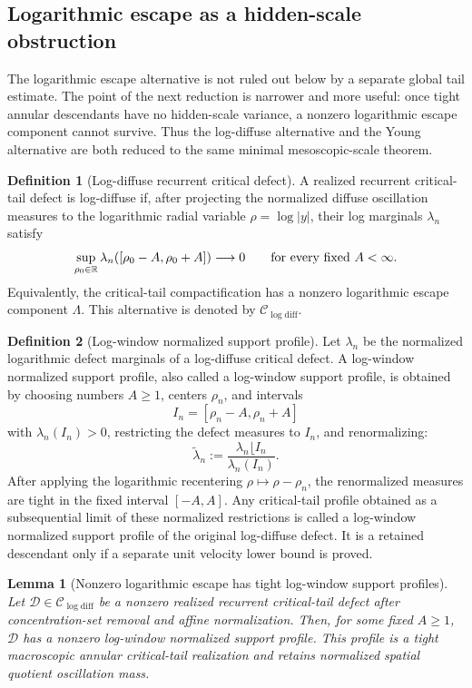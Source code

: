 \documentclass[11pt]{amsart}
\numberwithin{equation}{section}
\theoremstyle{plain}
\newtheorem{lemma}[lemma]{Lemma}
\theoremstyle{definition}
\newtheorem{definition}[definition]{Definition}
\theoremstyle{remark}
\newcommand{\Clogdiff}{\mathcal C_{\log\mathrm{diff}}}
\begin{document}
\subsection{Logarithmic escape as a hidden-scale obstruction}
\label{subsec:logarithmic-escape-hidden-scale}

The logarithmic escape alternative is not ruled out below by a separate global
tail estimate.  The point of the next reduction is narrower and more useful:
once tight annular descendants have no hidden-scale variance, a nonzero
logarithmic escape component cannot survive.  Thus the log-diffuse alternative and
the Young alternative are both reduced to the same minimal mesoscopic-scale
theorem.

\begin{definition}[Log-diffuse recurrent critical defect]
\label{def:log-diffuse-recurrent-critical-defect}
A realized recurrent critical-tail defect is log-diffuse if, after projecting
the normalized diffuse oscillation measures to the logarithmic radial variable
\(\rho=\log |y|\), their log marginals \(\lambda_n\) satisfy
\[
   \sup_{\rho_0\in\mathbb R}
   \lambda_n([\rho_0-A,\rho_0+A])\longrightarrow0
   \qquad\hbox{for every fixed }A<\infty .
\]
Equivalently, the critical-tail compactification has a nonzero logarithmic
escape component \(\Lambda\).  This alternative is denoted by \(\Clogdiff\).
\end{definition}

\begin{definition}[Log-window normalized support profile]
\label{def:log-window-descendant}
Let \(\lambda_n\) be the normalized logarithmic defect marginals of a
log-diffuse critical defect.  A log-window normalized support profile, also
called a log-window support profile, is obtained by choosing
numbers \(A\ge1\), centers \(\rho_n\), and intervals
\[
   I_n=[\rho_n-A,\rho_n+A]
\]
with \(\lambda_n(I_n)>0\), restricting the defect measures to \(I_n\), and
renormalizing:
\[
   \widetilde\lambda_n
   :=
   \frac{\lambda_n\lfloor I_n}{\lambda_n(I_n)} .
\]
After applying the logarithmic recentering \(\rho\mapsto\rho-\rho_n\), the
renormalized measures are tight in the fixed interval \([-A,A]\).  Any
critical-tail profile obtained as a subsequential limit of these normalized
restrictions is called a log-window normalized support profile of the original
log-diffuse defect.  It is a retained descendant only if a separate unit
velocity lower bound is proved.
\end{definition}

\begin{lemma}[Nonzero logarithmic escape has tight log-window support profiles]
\label{lem:log-window-descendant-selection}
Let \(\mathcal D\in\Clogdiff\) be a nonzero realized recurrent critical-tail
defect after concentration-set removal and affine normalization.  Then, for some
fixed \(A\ge1\), \(\mathcal D\) has a nonzero log-window normalized support
profile.  This profile is a tight macroscopic annular critical-tail realization and
retains normalized spatial quotient oscillation mass.
\end{lemma}
\end{document}
